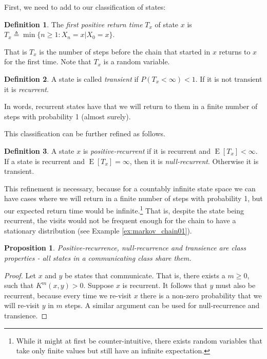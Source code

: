 \documentclass{book}
\theoremstyle{plain}%
\newtheorem{proposition}{Proposition}[section]
\theoremstyle{definition}
\newtheorem{definition}{Definition}[section]
\DeclareMathOperator{\E}{E}
\begin{document}
First, we need to add to our classification of states:

\begin{definition} The \emph{first positive return time} $T_x$ of state $x$ is $T_x \triangleq \min\{n \geq 1: X_n = x | X_0 = x\}$.
\end{definition}

That is $T_x$ is the number of steps before the chain that started in $x$ returns to $x$ for the first time. Note that $T_x$ is a random variable.

\begin{definition} A state is called \emph{transient} if $P(T_x < \infty ) < 1$. If it is not transient it is \emph{recurrent}.
\end{definition}

In words, recurrent states have that we will return to them in a finite number of steps with probability 1 (almost surely).

This classification can be further refined as follows.

\begin{definition} A state $x$ is \emph{positive-recurrent} if it is recurrent and $\E[T_x] < \infty$. If a state is recurrent and $\E[T_x] = \infty$, then it is \emph{null-recurrent}. Otherwise it is transient.
\end{definition}

This refinement is necessary, because for a countably infinite state space we can have cases where we will return in a finite number of steps with probability 1, but our expected return time would be infinite.\footnote{While it might at first be counter-intuitive, there exists random variables that take only finite values but still have an infinite expectation.} That is, despite the state being recurrent, the visits would not be frequent enough for the chain to have a stationary distribution (see Example \ref{ex:markov_chain01}).

\begin{proposition} Positive-recurrence, null-recurrence and transience are class properties - all states in a communicating class share them.
\end{proposition}

\begin{proof} Let $x$ and $y$ be states that communicate. That is, there exists a $m \geq 0$, such that $K^m(x, y) > 0$. Suppose $x$ is recurrent. It follows that $y$ must also be recurrent, because every time we re-visit $x$ there is a non-zero probability that we will re-visit $y$ in $m$ steps. A similar argument can be used for null-recurrence and transience.
\end{proof}
\end{document}
